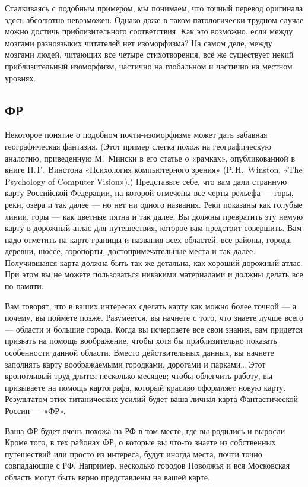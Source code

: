 \documentclass[../main.tex]{subfiles}
\begin{document}
Сталкиваясь с подобным примером, мы понимаем, что точный перевод оригинала здесь абсолютно невозможен. Однако даже в таком патологически трудном случае можно достичь приблизительного соответствия. Как это возможно, если между мозгами разноязыких читателей нет изоморфизма? На самом деле, между мозгами людей, читающих все четыре стихотворения, всё же существует некий приблизительный изоморфизм, частично на глобальном и частично на местном уровнях.


\subsection{ФР}

Некоторое понятие о подобном почти-изоморфизме может дать забавная географическая фантазия. (Этот пример слегка похож на географическую аналогию, приведенную М.~Мински в его статье о «рамках», опубликованной в книге П.\,Г.~Винстона «Психология компьютерного зрения» (P.\,H.~Winston, «The Psychology of Computer Vision»).) Представьте себе, что вам дали странную карту Российской Федерации, на которой отмечены все черты рельефа --- горы, реки, озера и так далее --- но нет ни одного названия. Реки показаны как голубые линии, горы --- как цветные пятна и так далее. Вы должны превратить эту немую карту в дорожный атлас для путешествия, которое вам предстоит совершить. Вам надо отметить на карте границы и названия всех областей, все районы, города, деревни, шоссе, аэропорты, достопримечательные места и так далее. Получившаяся карта должна быть так же детальна, как хороший дорожный атлас. При этом вы не можете пользоваться никакими материалами и должны делать все по памяти.

Вам говорят, что в ваших интересах сделать карту как можно более точной --- а почему, вы поймете позже. Разумеется, вы начнете с того, что знаете лучше всего --- области и большие города. Когда вы исчерпаете все свои знания, вам придется призвать на помощь воображение, чтобы хотя бы приблизительно показать особенности данной области. Вместо действительных данных, вы начнете заполнять карту воображаемыми городками, дорогами и парками\ldots{} Этот кропотливый труд длится несколько месяцев; чтобы облегчить работу, вы призываете на помощь картографа, который красиво оформляет новую карту. Результатом этих титанических усилий будет ваша личная карта Фантастической России --- «ФР».

Ваша ФР будет очень похожа на РФ в том месте, где вы родились и выросли Кроме того, в тех районах ФР, о которые вы что-то знаете из собственных путешествий или просто из интереса, будут иногда места, почти точно совпадающие с РФ\@. Например, несколько городов Поволжья и вся Московская область могут быть верно представлены на вашей карте.
\end{document}
